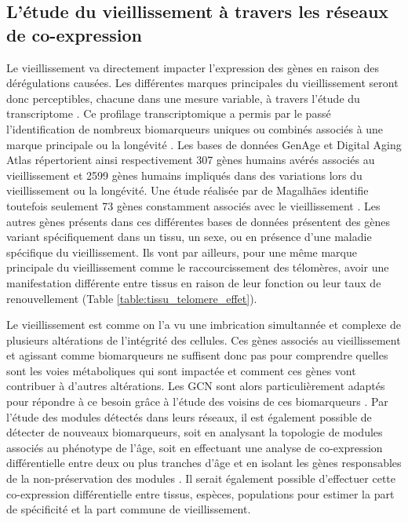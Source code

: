 \subsection{L'étude du vieillissement à travers les réseaux de co-expression}

Le vieillissement va directement impacter l'expression des gènes en raison des dérégulations causées. Les différentes marques principales du vieillissement seront donc perceptibles, chacune dans une mesure variable, à travers l'étude du transcriptome \cite{Saint2020Jun}. Ce profilage transcriptomique a permis par le passé l'identification de nombreux biomarqueurs uniques ou combinés associés à une marque principale ou la longévité \cite{Melzer2020}. Les bases de données GenAge \cite{DeMagalhaes2004} et Digital Aging Atlas \cite{Craig2015} répertorient ainsi respectivement 307 gènes humains avérés associés au vieillissement  et 2599 gènes humains impliqués dans des variations lors du vieillissement ou la longévité. Une étude réalisée par de Magalhães identifie toutefois seulement 73 gènes constamment associés avec le vieillissement \cite{DeMagalhaes2009intro}. Les autres gènes présents dans ces différentes bases de données présentent des gènes variant spécifiquement dans un tissu, un sexe, ou en présence d'une maladie spécifique du vieillissement. Ils vont par ailleurs, pour une même marque principale du vieillissement comme le raccourcissement des télomères, avoir une manifestation différente entre tissus en raison de leur fonction ou leur taux de renouvellement (Table \ref{table:tissu_telomere_effet}).

Le vieillissement est comme on l'a vu une imbrication simultannée et complexe de plusieurs altérations de l'intégrité des cellules. Ces gènes associés au vieillissement et agissant comme biomarqueurs ne suffisent donc pas pour comprendre quelles sont les voies métaboliques qui sont impactée et comment ces gènes vont contribuer à d'autres altérations. 
Les \acrshort{GCN} sont alors particulièrement adaptés pour répondre à ce besoin grâce à l'étude des voisins de ces biomarqueurs \cite{delaFuente2010Jul}. Par l'étude des modules détectés dans leurs réseaux, il est également possible de détecter de nouveaux biomarqueurs, soit en analysant la topologie de modules associés au phénotype de l'âge, soit en effectuant une analyse de co-expression différentielle entre deux ou plus tranches d'âge et en isolant les gènes responsables de la non-préservation des modules \cite{Zierer2015}. Il serait également possible d'effectuer cette co-expression différentielle entre tissus, espèces, populations pour estimer la part de spécificité et la part commune de vieillissement.

